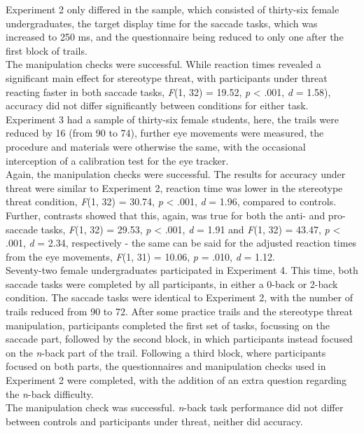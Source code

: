 \documentclass[
  stu,floatsintext]{apa7}
\begin{document}
Experiment 2 only differed in the sample, which consisted of thirty-six female undergraduates, the target display time for the saccade tasks, which was increased to 250 ms, and the questionnaire being reduced to only one after the first block of trails.\\
The manipulation checks were successful.
While reaction times revealed a significant main effect for stereotype threat, with participants under threat reacting faster in both saccade tasks, \emph{F}(1, 32) = 19.52, \emph{p} \textless{} .001, \emph{d} = 1.58), accuracy did not differ significantly between conditions for either task.\\
Experiment 3 had a sample of thirty-six female students, here, the trails were reduced by 16 (from 90 to 74), further eye movements were measured, the procedure and materials were otherwise the same, with the occasional interception of a calibration test for the eye tracker.\\
Again, the manipulation checks were successful.
The results for accuracy under threat were similar to Experiment 2, reaction time was lower in the stereotype threat condition, \emph{F}(1, 32) = 30.74, \emph{p} \textless{} .001, \emph{d} = 1.96, compared to controls.
Further, contrasts showed that this, again, was true for both the anti- and pro-saccade tasks, \emph{F}(1, 32) = 29.53, \emph{p} \textless{} .001, \emph{d} = 1.91 and \emph{F}(1, 32) = 43.47, \emph{p} \textless{} .001, \emph{d} = 2.34, respectively - the same can be said for the adjusted reaction times from the eye movements, \emph{F}(1, 31) = 10.06, \emph{p} = .010, \emph{d} = 1.12.\\
Seventy-two female undergraduates participated in Experiment 4.
This time, both saccade tasks were completed by all participants, in either a 0-back or 2-back condition.
The saccade tasks were identical to Experiment 2, with the number of trails reduced from 90 to 72.
After some practice trails and the stereotype threat manipulation, participants completed the first set of tasks, focussing on the saccade part, followed by the second block, in which participants instead focused on the \emph{n}-back part of the trail.
Following a third block, where participants focused on both parts, the questionnaires and manipulation checks used in Experiment 2 were completed, with the addition of an extra question regarding the \emph{n}-back difficulty.\\
The manipulation check was successful.
\emph{n}-back task performance did not differ between controls and participants under threat, neither did accuracy.
\end{document}
